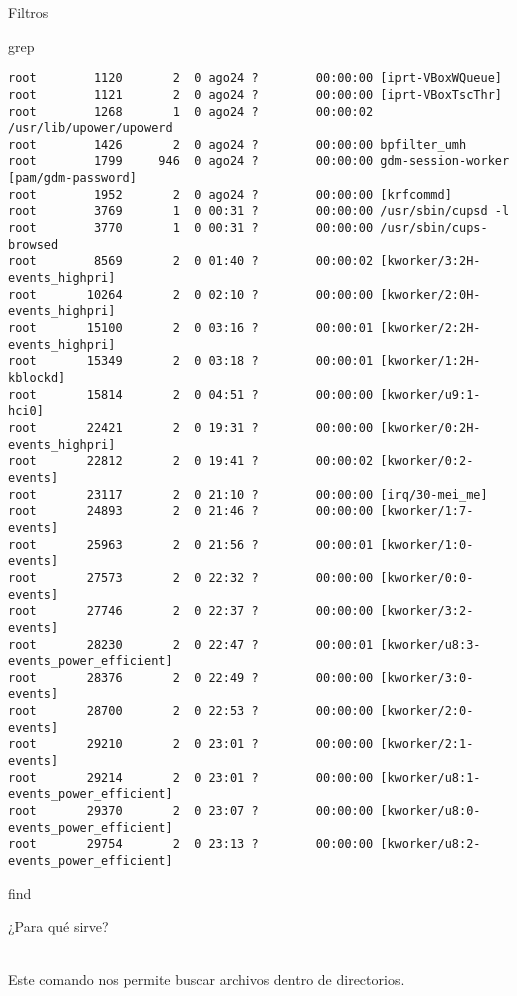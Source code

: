 \begin{section}{Filtros}
\begin{subsection}{grep}
\begin{lstlisting}[style=Ubuntu]
root        1120       2  0 ago24 ?        00:00:00 [iprt-VBoxWQueue]
root        1121       2  0 ago24 ?        00:00:00 [iprt-VBoxTscThr]
root        1268       1  0 ago24 ?        00:00:02 /usr/lib/upower/upowerd
root        1426       2  0 ago24 ?        00:00:00 bpfilter_umh
root        1799     946  0 ago24 ?        00:00:00 gdm-session-worker [pam/gdm-password]
root        1952       2  0 ago24 ?        00:00:00 [krfcommd]
root        3769       1  0 00:31 ?        00:00:00 /usr/sbin/cupsd -l
root        3770       1  0 00:31 ?        00:00:00 /usr/sbin/cups-browsed
root        8569       2  0 01:40 ?        00:00:02 [kworker/3:2H-events_highpri]
root       10264       2  0 02:10 ?        00:00:00 [kworker/2:0H-events_highpri]
root       15100       2  0 03:16 ?        00:00:01 [kworker/2:2H-events_highpri]
root       15349       2  0 03:18 ?        00:00:01 [kworker/1:2H-kblockd]
root       15814       2  0 04:51 ?        00:00:00 [kworker/u9:1-hci0]
root       22421       2  0 19:31 ?        00:00:00 [kworker/0:2H-events_highpri]
root       22812       2  0 19:41 ?        00:00:02 [kworker/0:2-events]
root       23117       2  0 21:10 ?        00:00:00 [irq/30-mei_me]
root       24893       2  0 21:46 ?        00:00:00 [kworker/1:7-events]
root       25963       2  0 21:56 ?        00:00:01 [kworker/1:0-events]
root       27573       2  0 22:32 ?        00:00:00 [kworker/0:0-events]
root       27746       2  0 22:37 ?        00:00:00 [kworker/3:2-events]
root       28230       2  0 22:47 ?        00:00:01 [kworker/u8:3-events_power_efficient]
root       28376       2  0 22:49 ?        00:00:00 [kworker/3:0-events]
root       28700       2  0 22:53 ?        00:00:00 [kworker/2:0-events]
root       29210       2  0 23:01 ?        00:00:00 [kworker/2:1-events]
root       29214       2  0 23:01 ?        00:00:00 [kworker/u8:1-events_power_efficient]
root       29370       2  0 23:07 ?        00:00:00 [kworker/u8:0-events_power_efficient]
root       29754       2  0 23:13 ?        00:00:00 [kworker/u8:2-events_power_efficient]

\end{lstlisting}

\end{subsection}

\begin{subsection}{find}
\begin{quoting}
¿Para qué sirve?
\end{quoting}\\
Este comando nos permite buscar archivos dentro de directorios.


\end{subsection}
\end{section}
